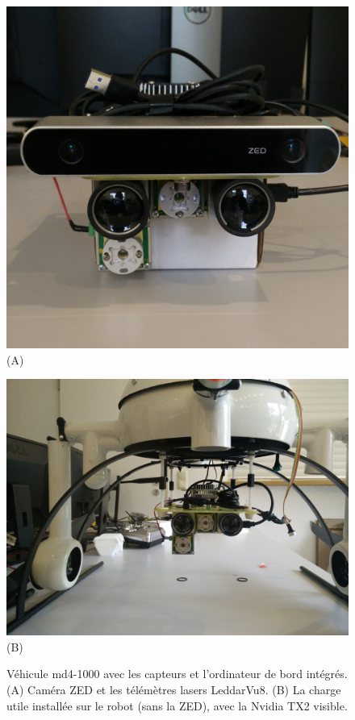 \begin{figure}[htp]
  \centering
  \begin{minipage}{0.45\textwidth}
    \centering
    \includegraphics[width=\linewidth]{images/payload.jpg}
    (A)
  \end{minipage}
  \begin{minipage}{0.45\textwidth}
    \centering
    \includegraphics[width=\linewidth]{images/payload2.jpg}
    (B)
  \end{minipage}
  \caption[Véhicule md4-1000 avec les capteurs et l'ordinateur de bord intégrés]{Véhicule md4-1000 avec les capteurs et l'ordinateur de bord intégrés. (A) Caméra ZED et les télémètres lasers LeddarVu8. (B) La charge utile installée sur le robot (sans la ZED), avec la Nvidia TX2 visible.}
  \label{fig:field_vehicle}
\end{figure}

